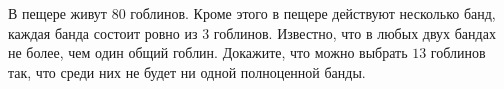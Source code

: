 В пещере живут $80$ гоблинов. Кроме этого в пещере действуют несколько банд, каждая банда состоит ровно из $3$ гоблинов. Известно, что в любых двух бандах не более, чем один общий гоблин. Докажите, что можно выбрать $13$ гоблинов так, что среди них не будет ни одной полноценной банды.